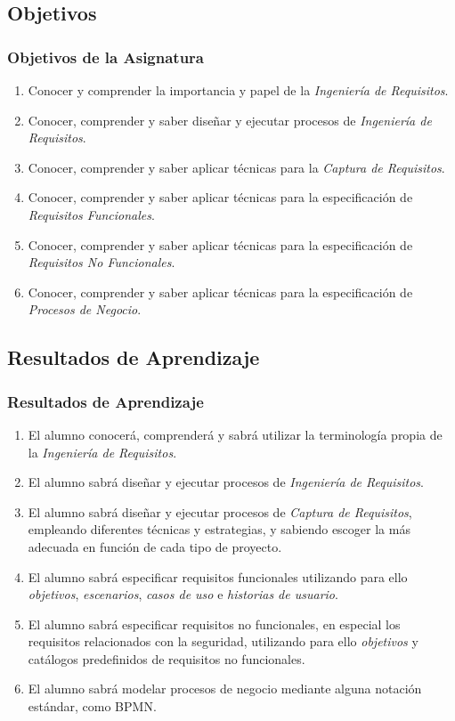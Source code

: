 \documentclass[handout,a4paper,slidestop,xcolor=pst,dvips,blue]{beamer}
\begin{document}
\subsection{Objetivos}

\begin{frame}[t]
	\frametitle{Objetivos de la Asignatura}
    \begin{enumerate}
			\item<1-> Conocer y comprender la importancia y papel de la \emph{Ingeniería de Requisitos}.
            \item<2-> Conocer, comprender y saber diseñar y ejecutar procesos de \emph{Ingeniería de Requisitos}.
			\item<3-> Conocer, comprender y saber aplicar técnicas para la \emph{Captura de Requisitos}.
			\item<4-> Conocer, comprender y saber aplicar técnicas para la especificación de \emph{Requisitos Funcionales}.
			\item<5-> Conocer, comprender y saber aplicar técnicas para la especificación de \emph{Requisitos No Funcionales}.
			\item<6-> Conocer, comprender y saber aplicar técnicas para la especificación de \emph{Procesos de Negocio}.
	 \end{enumerate}
\end{frame}

\subsection{Resultados de Aprendizaje}

\begin{frame}[t]
	\frametitle{Resultados de Aprendizaje}
    	\begin{enumerate}
			\item<1-> El alumno conocerá, comprenderá y sabrá utilizar la terminología propia de la \emph{Ingeniería de Requisitos}.
			\item<2-> El alumno sabrá diseñar y ejecutar procesos de \emph{Ingeniería de Requisitos}.
            \item<3-> El alumno sabrá diseñar y ejecutar procesos de \emph{Captura de Requisitos}, empleando diferentes técnicas y estrategias, y sabiendo escoger la más adecuada en función de cada tipo de proyecto.
            \item<4-> El alumno sabrá especificar requisitos funcionales utilizando para ello \emph{objetivos}, \emph{escenarios}, \emph{casos de uso} e \emph{historias de usuario}.
            \item<5-> El alumno sabrá especificar requisitos no funcionales, en especial los requisitos relacionados con la seguridad, utilizando para ello \emph{objetivos} y catálogos predefinidos de requisitos no funcionales.
            \item<6-> El alumno sabrá modelar procesos de negocio mediante alguna notación estándar, como BPMN.
		\end{enumerate}
\end{frame}
\end{document}
